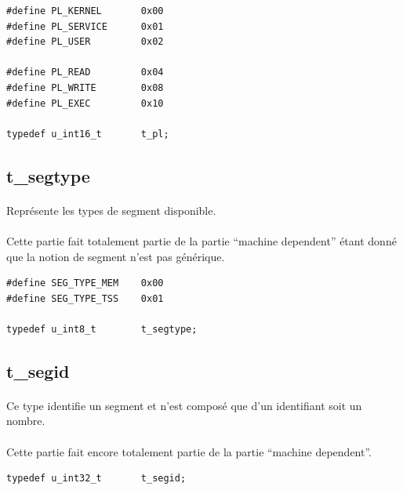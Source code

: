 \documentclass[10pt,a4wide]{article}
\begin{document}
\begin{verbatim}
#define PL_KERNEL       0x00
#define PL_SERVICE      0x01
#define PL_USER         0x02

#define PL_READ         0x04
#define PL_WRITE        0x08
#define PL_EXEC         0x10

typedef u_int16_t       t_pl;
\end{verbatim}

\subsection{t\_segtype}

\paragraph{}

Repr\'esente les types de segment disponible.

\paragraph{}

Cette partie fait totalement partie de la partie ``machine dependent''
\'etant donn\'e que la notion de segment n'est pas g\'en\'erique.

\begin{verbatim}
#define SEG_TYPE_MEM    0x00
#define SEG_TYPE_TSS    0x01

typedef u_int8_t        t_segtype;
\end{verbatim}

\subsection{t\_segid}

\paragraph{}

Ce type identifie un segment et n'est compos\'e que d'un identifiant soit
un nombre.

\paragraph{}

Cette partie fait encore totalement partie de la partie ``machine dependent''.

\begin{verbatim}
typedef u_int32_t       t_segid;
\end{verbatim}
\end{document}
